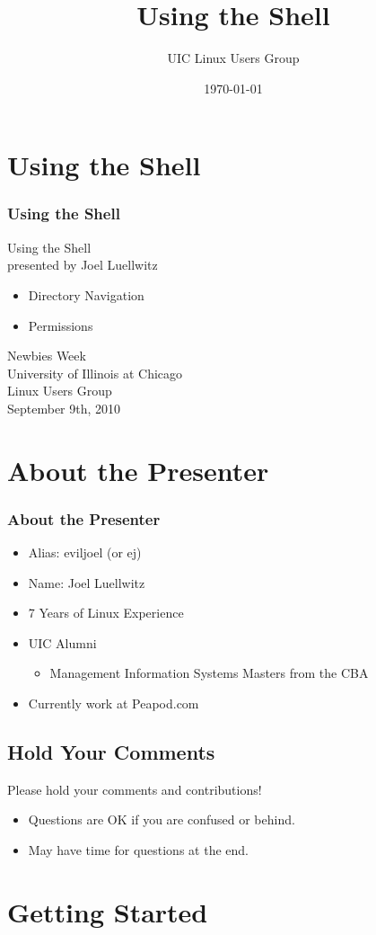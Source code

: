 \documentclass[hyperref={pdfpagelabels=false}]{beamer}
\title{Using the Shell}
\author{UIC Linux Users Group}
\date{\today}
\begin{document}
\frame{\titlepage}
\section{Using the Shell}
\frame
{
    \frametitle{Using the Shell}
    Using the Shell\\
    presented by Joel Luellwitz\\
    \begin{itemize}
    \item{Directory Navigation}
    \item{Permissions}
    \end{itemize}
    Newbies Week\\
    University of Illinois at Chicago\\
    Linux Users Group\\
    September 9th, 2010\\
}
\section{About the Presenter}
\frame
{
    \frametitle{About the Presenter}
    \begin{itemize}
    \item{Alias: eviljoel (or ej)}
    \item{Name: Joel Luellwitz}
    \item{7 Years of Linux Experience}
    \item{UIC Alumni}
    \begin{itemize}
        \item{Management Information Systems Masters from the CBA}
    \end{itemize}
    \item{Currently work at Peapod.com}
    \end{itemize}
	
}
\subsection{Hold Your Comments}
\frame
{
Please hold your comments and contributions!
    \begin{itemize}
    \item{Questions are OK if you are confused or behind.}
    \item{May have time for questions at the end.}
    \end{itemize}
}
\section{Getting Started}
\end{document}
